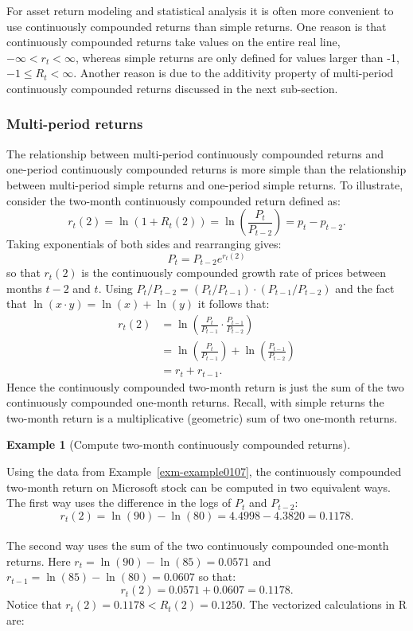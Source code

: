 \documentclass[
  letterpaper,
  DIV=11,
  numbers=noendperiod]{scrreprt}
\theoremstyle{definition}
\theoremstyle{definition}
\newtheorem{example}{Example}[chapter]
\theoremstyle{remark}
\begin{document}
For asset return modeling and statistical analysis it is often more
convenient to use continuously compounded returns than simple returns.
One reason is that continuously compounded returns take values on the
entire real line, \(-\infty < r_{t} < \infty\), whereas simple returns
are only defined for values larger than -1, \(-1 \le R_{t} < \infty\).
Another reason is due to the additivity property of multi-period
continuously compounded returns discussed in the next sub-section.

\hypertarget{multi-period-returns-1}{%
\subsubsection{Multi-period returns}\label{multi-period-returns-1}}

The relationship between multi-period continuously compounded returns
and one-period continuously compounded returns is more simple than the
relationship between multi-period simple returns and one-period simple
returns. To illustrate, consider the two-month continuously compounded
return defined as:
\[r_{t}(2)=\ln(1+R_{t}(2))=\ln\left(\frac{P_{t}}{P_{t-2}}\right)=p_{t}-p_{t-2}.\]
Taking exponentials of both sides and rearranging gives:
\[P_{t}=P_{t-2}e^{r_{t}(2)}\] so that \(r_{t}(2)\) is the continuously
compounded growth rate of prices between months \(t-2\) and \(t\). Using
\(P_{t}/P_{t-2}=(P_{t}/P_{t-1})\cdot(P_{t-1}/P_{t-2})\) and the fact
that \(\ln(x\cdot y)=\ln(x)+\ln(y)\) it follows that: \begin{align*}
r_{t}(2) & =\ln\left(\frac{P_{t}}{P_{t-1}}\cdot\frac{P_{t-1}}{P_{t-2}}\right)\\
 & =\ln\left(\frac{P_{t}}{P_{t-1}}\right)+\ln\left(\frac{P_{t-1}}{P_{t-2}}\right)\\
 & =r_{t}+r_{t-1}.
\end{align*} Hence the continuously compounded two-month return is just
the sum of the two continuously compounded one-month returns. Recall,
with simple returns the two-month return is a multiplicative (geometric)
sum of two one-month returns.

\begin{example}[Compute two-month continuously compounded
returns]\protect\hypertarget{exm-example0116}{}\label{exm-example0116}

Using the data from Example~\ref{exm-example0107}, the continuously
compounded two-month return on Microsoft stock can be computed in two
equivalent ways. The first way uses the difference in the logs of
\(P_{t}\) and \(P_{t-2}\): \[
r_{t}(2)=\ln(90)-\ln(80)=4.4998-4.3820=0.1178.
\]\\
The second way uses the sum of the two continuously compounded one-month
returns. Here \(r_{t}=\ln(90)-\ln(85)=0.0571\) and
\(r_{t-1}=\ln(85)-\ln(80)=0.0607\) so that: \[
r_{t}(2)=0.0571+0.0607=0.1178. 
\] Notice that \(r_{t}(2)=0.1178<R_{t}(2)=0.1250\). The vectorized
calculations in R are:

\end{example}
\end{document}
